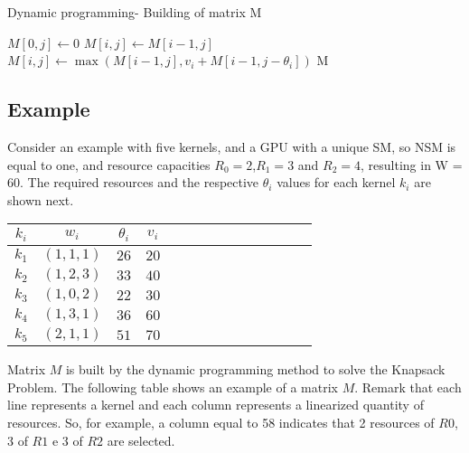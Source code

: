 \begin{algorithm}[htb]
\caption{Dynamic programming- Building of matrix M}\label{alg:dynamic}
\footnotesize{
\begin{algorithmic}[1]
 \State $M[0, j] \gets 0$
\EndFor
{}
   \State $M[i,j] \gets M[i-1,j]$
  \Else
   \State $M[i,j] \gets \max(M[i-1,j],v_i + M[i-1,j-\theta_i])$
  \EndIf
 \EndFor
\EndFor
\State \Return M
\EndFunction
\end{algorithmic}
}
\end{algorithm}

\subsection{Example}

 Consider an example with five kernels,  and a GPU with a unique SM, so NSM  is equal to one, and resource capacities $R_0 = 2$,$R_1 = 3$ and $R_2=4$, resulting in W = 60.  The required resources and the respective $\theta_i$ values for each kernel $k_i$ are shown next. 

\begin{center}
\begin{tabular}{ |c|c|c|c|c|c|c|c|c|c|c|c|c|c| } 
 \hline
 $k_i$ & $w_i$ & $\theta_i$ & $v_i$ \\
 \hline
 $k_1$ & $(1,1,1)$ & $26$ & $20$ \\
 \hline
 $k_2$ & $(1,2,3)$ & $33$ & $40$\\
 \hline
 $k_3$ & $(1,0,2)$ & $22$ & $30$ \\
 \hline
 $k_4$ & $(1,3,1)$ & $36$ & $60$ \\
 \hline
 $k_5$ & $(2,1,1)$ & $51$ & $70$ \\
 \hline
\end{tabular}
\end{center}

Matrix $M$ is built by the dynamic programming method to solve the Knapsack Problem. The following table shows  an example of  a matrix $M$. Remark that each line represents a kernel and each column represents a linearized quantity of resources. So, for example, a column equal to 58 indicates that  2 resources of $R0$, 3 of $R1$ e 3 of $R2$ are selected. 

